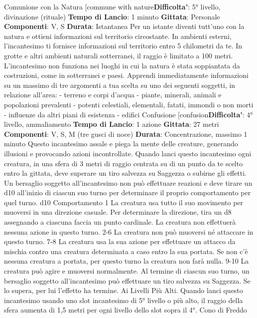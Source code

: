 \begin{multicols}{2}
Comunione con la Natura
[commune with nature\textbf{Difficolta'}:
5° livello, divinazione (rituale)
\textbf{Tempo di Lancio}: 1 minuto
\textbf{Gittata}: Personale
\textbf{Componenti}: V, S
\textbf{Durata}: Istantanea
Per un istante diventi tutt’uno con la natura e ottieni
informazioni sul territorio circostante. In ambienti
esterni, l’incantesimo ti fornisce informazioni sul
territorio entro 5 chilometri da te. In grotte e altri 
ambienti naturali sotterranei, il raggio è limitato a 100
metri. L’incantesimo non funziona nei luoghi in cui la
natura è stata soppiantata da costruzioni, come in
sotterranei e paesi.
Apprendi immediatamente informazioni su un massimo
di tre argomenti a tua scelta su uno dei seguenti
soggetti, in relazione all’area:
- terreno e corpi d’acqua
- piante, minerali, animali e popolazioni prevalenti
- potenti celestiali, elementali, fatati, immondi o non
morti
- influenze da altri piani di esistenza
- edifici
Confusione
[confusion\textbf{Difficolta'}:
4° livello, ammaliamento
\textbf{Tempo di Lancio}: 1 azione
\textbf{Gittata}: 27 metri
\textbf{Componenti}: V, S, M (tre gusci di noce)
\textbf{Durata}: Concentrazione, massimo 1 minuto
Questo incantesimo assale e piega la mente delle
creature, generando illusioni e provocando azioni
incontrollate. Quando lanci questo incantesimo ogni
creatura, in una sfera di 3 metri di raggio centrata su di
un punto da te scelto entro la gittata, deve superare un
tiro salvezza su Saggezza o subirne gli effetti.
Un bersaglio soggetto all’incantesimo non può
effettuare reazioni e deve tirare un d10 all’inizio di
ciascun suo turno per determinare il proprio
comportamento per quel turno.
d10 Comportamento
1 La creatura usa tutto il suo movimento per muoversi in una
direzione casuale. Per determinare la direzione, tira un d8
assegnando a ciascuna faccia un punto cardinale. La
creatura non effettuerà nessuna azione in questo turno.
2-6 La creatura non può muoversi né attaccare in questo turno.
7-8 La creatura usa la sua azione per effettuare un attacco da
mischia contro una creatura determinata a caso entro la sua
portata. Se non c’è nessuna creatura a portata, per questo
turno la creatura non farà nulla.
9-10 La creatura può agire e muoversi normalmente.
Al termine di ciascun suo turno, un bersaglio soggetto
all’incantesimo può effettuare un tiro salvezza su
Saggezza. Se lo supera, per lui l’effetto ha termine.
Ai Livelli Più Alti. Quando lanci questo incantesimo
usando uno slot incantesimo di 5° livello o più alto, il
raggio della sfera aumenta di 1,5 metri per ogni livello
dello slot sopra il 4°.
Cono di Freddo

\end{multicols}
